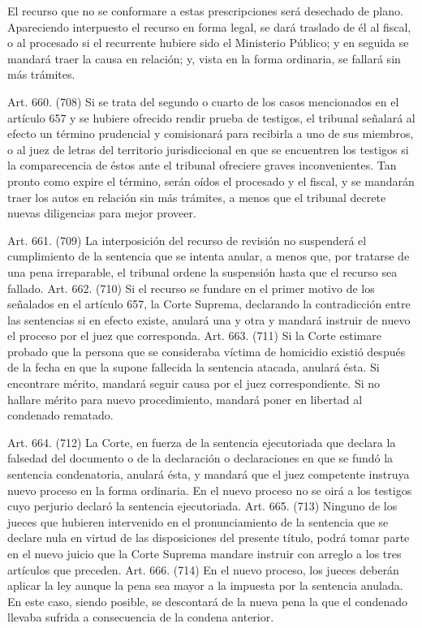     El recurso que no se conformare a estas prescripciones será desechado de plano.
    Apareciendo interpuesto el recurso en forma legal, se dará traslado de él al fiscal, o al procesado si el recurrente hubiere sido el Ministerio Público; y en seguida se mandará traer la causa en relación; y, vista en la forma ordinaria, se fallará sin más trámites.


    Art. 660. (708) Si se trata del segundo o cuarto de los casos mencionados en el artículo 657 y se hubiere ofrecido rendir prueba de testigos, el tribunal señalará al efecto un término prudencial y comisionará para recibirla a uno de sus miembros, o al juez de letras del territorio jurisdiccional en que se encuentren los testigos si la comparecencia de éstos ante el tribunal ofreciere graves inconvenientes. Tan pronto como expire el término, serán oídos el procesado y el fiscal, y se mandarán traer los autos en relación sin más trámites, a menos que el tribunal decrete nuevas diligencias para mejor proveer.


    Art. 661. (709) La interposición del recurso de revisión no suspenderá el cumplimiento de la sentencia que se intenta anular, a menos que, por tratarse de una pena irreparable, el tribunal ordene la suspensión hasta que el recurso sea fallado.
    Art. 662. (710) Si el recurso se fundare en el primer motivo de los señalados en el artículo 657, la Corte Suprema, declarando la contradicción entre las sentencias si en efecto existe, anulará una y otra y mandará instruir de nuevo el proceso por el juez que corresponda.
    Art. 663. (711) Si la Corte estimare probado que la persona que se consideraba víctima de homicidio existió después de la fecha en que la supone fallecida la sentencia atacada, anulará ésta.
    Si encontrare mérito, mandará seguir causa por el juez correspondiente.
    Si no hallare mérito para nuevo procedimiento, mandará poner en libertad al condenado rematado.




    Art. 664. (712) La Corte, en fuerza de la sentencia ejecutoriada que declara la falsedad del documento o de la declaración o declaraciones en que se fundó la sentencia condenatoria, anulará ésta, y mandará que el juez competente instruya nuevo proceso en la forma ordinaria.
    En el nuevo proceso no se oirá a los testigos cuyo perjurio declaró la sentencia ejecutoriada.
    Art. 665. (713) Ninguno de los jueces que hubieren intervenido en el pronunciamiento de la sentencia que se declare nula en virtud de las disposiciones del presente título, podrá tomar parte en el nuevo juicio que la Corte Suprema mandare instruir con arreglo a los tres artículos que preceden.
    Art. 666. (714) En el nuevo proceso, los jueces deberán aplicar la ley aunque la pena sea mayor a la impuesta por la sentencia anulada.
    En este caso, siendo posible, se descontará de la nueva pena la que el condenado llevaba sufrida a consecuencia de la condena anterior.



